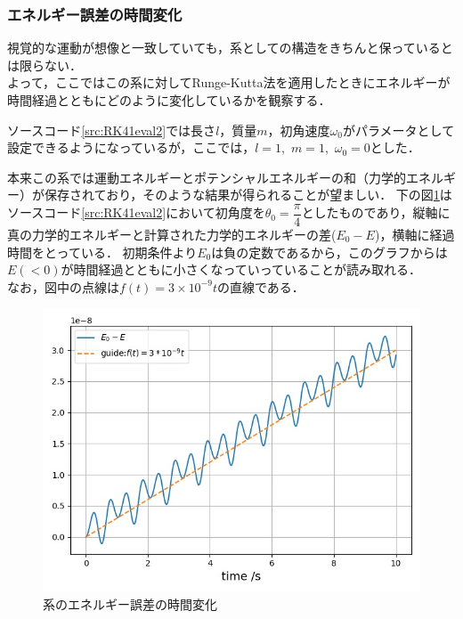 \documentclass[a4paper,11pt]{jsarticle}
\begin{document}
\subsubsection{エネルギー誤差の時間変化}
視覚的な運動が想像と一致していても，系としての構造をきちんと保っているとは限らない．\\
よって，ここではこの系に対してRunge-Kutta法を適用したときにエネルギーが時間経過とともにどのように変化しているかを観察する．\par
ソースコード\ref{src:RK41eval2}では長さ\(l\)，質量\(m\)，初角速度\(\omega_0\)がパラメータとして設定できるようになっているが，ここでは，\(l=1\),\ \(m=1\),\ \(\omega_0=0\)とした．\par
本来この系では運動エネルギーとポテンシャルエネルギーの和（力学的エネルギー）が保存されており，そのような結果が得られることが望ましい．
下の図\ref{fig:RK41_eval2}はソースコード\ref{src:RK41eval2}において初角度を\(\theta_0 = \dfrac{\pi}{4}\)としたものであり，縦軸に真の力学的エネルギーと計算された力学的エネルギーの差(\(E_0 - E\))，横軸に経過時間をとっている．
初期条件より\(E_0\)は負の定数であるから，このグラフからは\(E (< 0)\)が時間経過とともに小さくなっていっていることが読み取れる．\\
なお，図中の点線は\(f(t) = 3\times10^{-9}t\)の直線である．
\begin{figure}[H]
  \begin{center}
    \includegraphics[scale=0.6]{figure/RK41/evaluation2/2021-2-9-223945.jpeg}
    \caption{系のエネルギー誤差の時間変化}
    \label{fig:RK41_eval2}
  \end{center}
\end{figure}
\newpage
\end{document}
